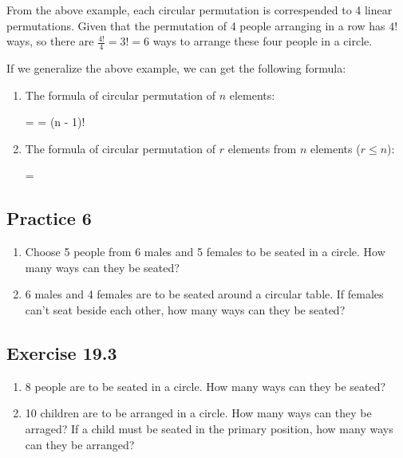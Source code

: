 \documentclass{report}
\newcommand\permtwo[2][^n]{{}_{#1}P_{#2}}
\begin{document}
\begin{multicols}{2}
  From the above example, each circular permutation is correspended to 4 linear
  permutations. Given that the permutation of 4 people arranging in a row has
  $4!$ ways, so there are $\frac{4!}{4} = 3! = 6$ ways to arrange these four
  people in a circle.

  If we generalize the above example, we can get the following formula:

  \begin{enumerate}
    \item The formula of circular permutation of $n$ elements:
          \begin{cequation}
            \frac{\permtwo[n]{n}}{n} =  = (n - 1)!
          \end{cequation}
    \item The formula of circular permutation of $r$ elements from $n$ elements ($r \leq
            n$):
          \begin{cequation}
            \frac{\permtwo[n]{r}}{r} = 
          \end{cequation}
  \end{enumerate}

  \subsection{Practice 6}

  \begin{enumerate}
    \item Choose 5 people from 6 males and 5 females to be seated in a circle. How many
          ways can they be seated?

    \item 6 males and 4 females are to be seated around a circular table. If females can't seat beside each other, how many ways can they be seated?
  \end{enumerate}

  \subsection{Exercise 19.3}

  \begin{enumerate}
    \item 8 people are to be seated in a circle. How many ways can they be seated?

    \item 10 children are to be arranged in a circle. How many ways can they be
          arraged? If a child must be seated in the primary position, how many ways can they be arranged?


\end{enumerate}
\end{multicols}
\end{document}
